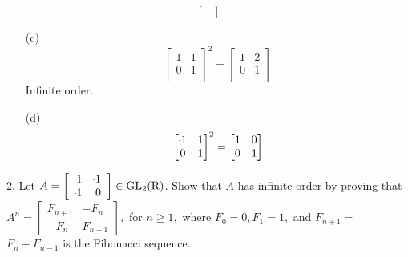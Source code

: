 \begin{mdframed}[style=darkAnswer,frametitle={Joe Starr}]
\begin{multicols}{2}
\begin{itemize}
{$$\begin{bmatrix}
      \end{bmatrix}$$}
\end{itemize}
\end{multicols}
\begin{multicols}{2}
\begin{itemize}
\item[(c)]{
    $$\begin{bmatrix}1 & 1 \\
      0 & 1 \\
      \end{bmatrix}^2=\begin{bmatrix}1 & 2 \\
      0 & 1 \\
      \end{bmatrix}$$
    Infinite order.
  }
\item[(d)]{
    $$\begin{bmatrix}\m 1 & 1 \\
      0 & 1 \\
      \end{bmatrix}^2=\begin{bmatrix}1 & 0 \\
      0 & 1 \\
      \end{bmatrix}$$}
\end{itemize}
\end{multicols}
\end{mdframed}
\newpage
\begin{mdframed}[style=darkQuesion]
2. Let $A=\left[\begin{array}{rr}1 & \m 1 \\
      \m 1 & 0\end{array}\right] \in \mathrm{GL}_{2}(\mathrm{R})$.
Show that $A$ has infinite order by proving that
$A^{n}=\left[\begin{array}{cc}F_{n+1} & -F_{n} \\
      -F_{n} & F_{n-1}\end{array}\right],$
for $n \geq 1,$ where $F_{0}=0, F_{1}=1,$ and $F_{n+1}=$
$F_{n}+F_{n-1}$ is the Fibonacci sequence.
\end{mdframed}


